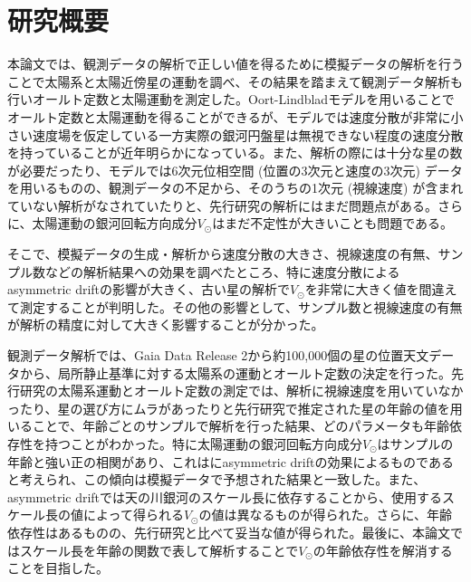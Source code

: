 \chapter*{研究概要}
本論文では、観測データの解析で正しい値を得るために模擬データの解析を行うことで太陽系と太陽近傍星の運動を調べ、その結果を踏まえて観測データ解析も行いオールト定数と太陽運動を測定した。Oort-Lindbladモデルを用いることでオールト定数と太陽運動を得ることができるが、モデルでは速度分散が非常に小さい速度場を仮定している一方実際の銀河円盤星は無視できない程度の速度分散を持っていることが近年明らかになっている。また、解析の際には十分な星の数が必要だったり、モデルでは6次元位相空間 (位置の3次元と速度の3次元) データを用いるものの、観測データの不足から、そのうちの1次元 (視線速度) が含まれていない解析がなされていたりと、先行研究の解析にはまだ問題点がある。さらに、太陽運動の銀河回転方向成分$V_{\odot}$はまだ不定性が大きいことも問題である。

そこで、模擬データの生成・解析から速度分散の大きさ、視線速度の有無、サンプル数などの解析結果への効果を調べたところ、特に速度分散によるasymmetric driftの影響が大きく、古い星の解析で$V_{\odot}$を非常に大きく値を間違えて測定することが判明した。その他の影響として、サンプル数と視線速度の有無が解析の精度に対して大きく影響することが分かった。

観測データ解析では、Gaia Data Release 2から約100,000個の星の位置天文データから、局所静止基準に対する太陽系の運動とオールト定数の決定を行った。先行研究の太陽系運動とオールト定数の測定では、解析に視線速度を用いていなかったり、星の選び方にムラがあったりと先行研究で推定された星の年齢の値を用いることで、年齢ごとのサンプルで解析を行った結果、どのパラメータも年齢依存性を持つことがわかった。特に太陽運動の銀河回転方向成分$V_{\odot}$はサンプルの年齢と強い正の相関があり、これはにasymmetric driftの効果によるものであると考えられ、この傾向は模擬データで予想された結果と一致した。また、asymmetric driftでは天の川銀河のスケール長に依存することから、使用するスケール長の値によって得られる$V_{\odot}$の値は異なるものが得られた。さらに、年齢依存性はあるものの、先行研究と比べて妥当な値が得られた。最後に、本論文ではスケール長を年齢の関数で表して解析することで$V_{\odot}$の年齢依存性を解消することを目指した。